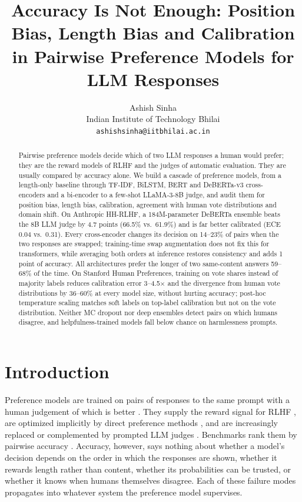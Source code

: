 \documentclass[11pt]{article}
\title{Accuracy Is Not Enough: Position Bias, Length Bias and Calibration\\
in Pairwise Preference Models for LLM Responses}
\author{Ashish Sinha \\
  Indian Institute of Technology Bhilai \\
  \texttt{ashishsinha@iitbhilai.ac.in}}
\begin{document}
\maketitle

\begin{abstract}
Pairwise preference models decide which of two LLM responses a human would prefer; they are the reward models of RLHF and the judges of automatic evaluation. They are usually compared by accuracy alone. We build a cascade of preference models, from a length-only baseline through TF-IDF, BiLSTM, BERT and DeBERTa-v3 cross-encoders and a bi-encoder to a few-shot LLaMA-3-8B judge, and audit them for position bias, length bias, calibration, agreement with human vote distributions and domain shift. On Anthropic HH-RLHF, a 184M-parameter DeBERTa ensemble beats the 8B LLM judge by 4.7 points (66.5\% vs.\ 61.9\%) and is far better calibrated (ECE 0.04 vs.\ 0.31). Every cross-encoder changes its decision on 14--23\% of pairs when the two responses are swapped; training-time swap augmentation does not fix this for transformers, while averaging both orders at inference restores consistency and adds 1 point of accuracy. All architectures prefer the longer of two same-content answers 59--68\% of the time. On Stanford Human Preferences, training on vote shares instead of majority labels reduces calibration error 3--4.5$\times$ and the divergence from human vote distributions by 36--60\% at every model size, without hurting accuracy; post-hoc temperature scaling matches soft labels on top-label calibration but not on the vote distribution. Neither MC dropout nor deep ensembles detect pairs on which humans disagree, and helpfulness-trained models fall below chance on harmlessness prompts.
\end{abstract}

\section{Introduction}

Preference models are trained on pairs of responses to the same prompt with a human judgement of which is better \citep{christiano2017deep,stiennon2020learning}. They supply the reward signal for RLHF \citep{ouyang2022training,bai2022training}, are optimized implicitly by direct preference methods \citep{rafailov2023direct}, and are increasingly replaced or complemented by prompted LLM judges \citep{zheng2023judging}. Benchmarks rank them by pairwise accuracy \citep{lambert2024rewardbench}. Accuracy, however, says nothing about whether a model's decision depends on the order in which the responses are shown, whether it rewards length rather than content, whether its probabilities can be trusted, or whether it knows when humans themselves disagree. Each of these failure modes propagates into whatever system the preference model supervises.
\end{document}
